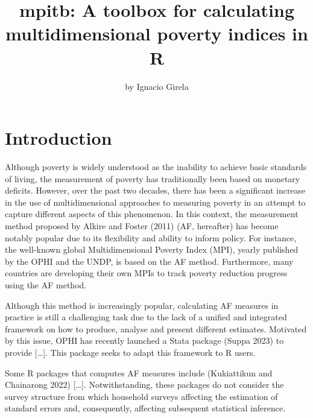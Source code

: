 \title{mpitb: A toolbox for calculating multidimensional poverty indices in R}


\author{by Ignacio Girela}

\maketitle


\hypertarget{introduction}{%
\section{Introduction}\label{introduction}}

Although poverty is widely understood as the inability to achieve basic standards of living, the measurement of poverty has traditionally been based on monetary deficits. However, over the past two decades, there has been a significant increase in the use of multidimensional approaches to measuring poverty in an attempt to capture different aspects of this phenomenon. In this context, the measurement method proposed by Alkire and Foster (2011) (AF, hereafter) has become notably popular due to its flexibility and ability to inform policy. For instance, the well-known global Multidimensional Poverty Index (MPI), yearly published by the OPHI and the UNDP, is based on the AF method. Furthermore, many countries are developing their own MPIs to track poverty reduction progress using the AF method.

Although this method is increasingly popular, calculating AF measures in practice is still a challenging task due to the lack of a unified and integrated framework on how to produce, analyse and present different estimates. Motivated by this issue, OPHI has recently launched a Stata package (Suppa 2023) to provide {[}\ldots{]}. This package seeks to adapt this framework to R users.

Some R packages that computes AF measures include  (Kukiattikun and Chainarong 2022) {[}\ldots{]}. Notwithstanding, these packages do not consider the survey structure from which household surveys affecting the estimation of standard errors and, consequently, affecting subsequent statistical inference.

